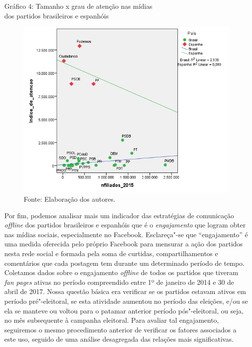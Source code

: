\begin{center}
Gráfico 4: Tamanho x grau de atenção nas mídias\\ dos partidos brasileiros
e espanhóis

\begin{figure}[!ht]
\centering
 \includegraphics[width=\textwidth]{./imgs/graf4.png}
\caption{Fonte: Elaboração dos autores.}
\end{figure}
\end{center}

Por fim, podemos analisar mais um indicador das estratégias de
comunicação \emph{offline} dos partidos brasileiros e espanhóis que é o
\emph{engajamento} que logram obter nas mídias sociais, especialmente no
Facebook. Esclareça"-se que ``engajamento'' é uma medida oferecida pelo
próprio Facebook para mensurar a ação dos partidos nesta rede social e
formada pela soma de curtidas, compartilhamentos e comentários que cada
postagem tem durante um determinado período de tempo. Coletamos dados
sobre o engajamento \emph{offline} de todos os partidos que tiveram \emph{fan
pages} ativas no período compreendido entre 1º de janeiro de 2014 e 30
de abril de 2017. Nossa questão básica era verificar se os partidos
estavam ativos em período pré"-eleitoral, se esta atividade aumentou no
período das eleições, e/ou se ela se manteve ou voltou para o patamar
anterior período pós"-eleitoral, ou seja, no mês subsequente à campanha
eleitoral. Para avaliar tal engajamento, seguiremos o mesmo procedimento
anterior de verificar os fatores associados a este uso, seguido de uma
análise desagregada das relações mais significativas.

